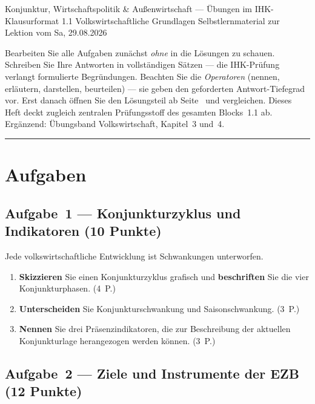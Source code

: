 \documentclass[11pt, a4paper]{article}
\begin{document}
%
  {Konjunktur, Wirtschaftspolitik \& Außenwirtschaft --- Übungen im IHK-Klausurformat}%
  {1.1 Volkswirtschaftliche Grundlagen}%
  {Selbstlernmaterial zur Lektion vom Sa, 29.08.2026}


\begin{merksatz}[title={\bfseries So nutzen Sie dieses Aufgabenheft}]
Bearbeiten Sie alle Aufgaben zunächst \emph{ohne} in die Lösungen zu schauen. Schreiben
Sie Ihre Antworten in vollständigen Sätzen --- die IHK-Prüfung verlangt formulierte
Begründungen. Beachten Sie die \emph{Operatoren} (nennen, erläutern, darstellen,
beurteilen) --- sie geben den geforderten Antwort-Tiefegrad vor. Erst danach öffnen Sie
den Lösungsteil ab Seite~\pageref{loesungen} und vergleichen. Dieses Heft deckt zugleich
zentralen Prüfungsstoff des gesamten Blocks~1.1 ab. Ergänzend: Übungsband Volkswirtschaft,
Kapitel~3 und~4.
\end{merksatz}

\tableofcontents
\vspace{1em}
\hrule

\section{Aufgaben}

\subsection*{Aufgabe~1 --- Konjunkturzyklus und Indikatoren (10 Punkte)}

Jede volkswirtschaftliche Entwicklung ist Schwankungen unterworfen.

\begin{enumerate}[label=(\alph*)]
  \item \textbf{Skizzieren} Sie einen Konjunkturzyklus grafisch und \textbf{beschriften}
    Sie die vier Konjunkturphasen. \hfill (4~P.)
  \item \textbf{Unterscheiden} Sie Konjunkturschwankung und Saisonschwankung. \hfill (3~P.)
  \item \textbf{Nennen} Sie drei Präsenzindikatoren, die zur Beschreibung der aktuellen
    Konjunkturlage herangezogen werden können. \hfill (3~P.)
\end{enumerate}

\subsection*{Aufgabe~2 --- Ziele und Instrumente der EZB (12 Punkte)}
\end{document}
